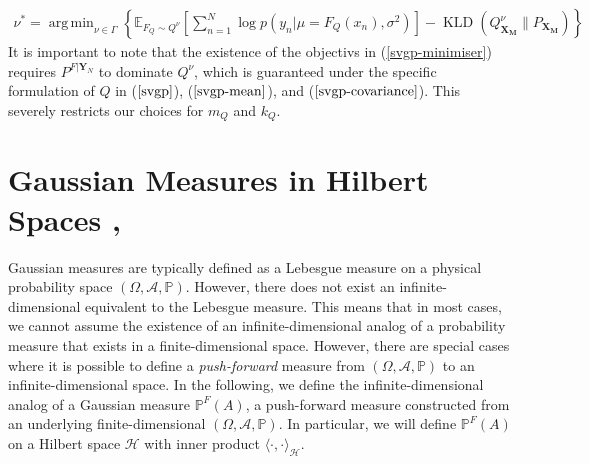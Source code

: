 \documentclass[twoside,11pt]{article}
\newcommand{\KLD}{\operatorname{KLD}}
\DeclareMathOperator*{\argmin}{arg\,min}
\begin{document}
\begin{align}
    \nu^* = \argmin_{\nu \in \Gamma} \left\{\mathbb{E}_{F_Q \sim Q^{\nu}}\left[\sum_{n=1}^{N}\log p\left(y_n \vert \mu=F_Q(x_n), \sigma^2\right)\right] -\KLD\left(Q^{\nu}_{\mathbf{X_M}}\Big\| P_{\mathbf{X_M}}\right)\right\}
    \label{svgp-minimiser-gvi-kld}
\end{align}
It is important to note that the existence of the objectivs in (\ref{svgp-minimiser}) requires $P^{F \vert \mathbf{Y}_N}$ to dominate $Q^{\nu}$, which is  guaranteed under the specific formulation of $Q$ in ($\ref{svgp}$),  ($\ref{svgp-mean}$), and ($\ref{svgp-covariance}$). This severely restricts our choices for $m_Q$ and $k_Q$. 
\section{Gaussian Measures in Hilbert Spaces \cite{wild2022generalized}, \cite{Kukush_2019}}
Gaussian measures are typically defined as a Lebesgue measure on a physical probability space $(\Omega, \mathcal{A}, \mathbb{P})$. However, there does not exist an infinite-dimensional equivalent to the Lebesgue measure. This means that in most cases, we cannot assume the existence of an infinite-dimensional analog of a probability measure that exists in a finite-dimensional space. However, there are special cases where it is possible to define a \textit{push-forward} measure from $(\Omega, \mathcal{A}, \mathbb{P})$ to an infinite-dimensional space. In the following, we define the infinite-dimensional analog of a Gaussian measure  $\mathbb{P}^{F}(A)$, a push-forward measure constructed from an underlying finite-dimensional $(\Omega, \mathcal{A}, \mathbb{P})$. In particular, we will define $\mathbb{P}^{F}(A)$ on a Hilbert space $\mathcal{H}$ with inner product $\langle \cdot, \cdot \rangle_\mathcal{H}$.
\end{document}
